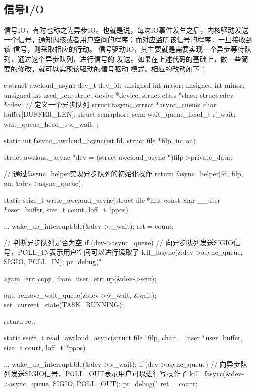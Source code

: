 \subsection{信号I/O}
信号IO，有时也称之为异步IO。也就是说，每次IO事件发生之后，内核驱动发送
一个信号，通知内核或者用户空间的程序；而对应监听该信号的程序，一旦接收到该
信号，则采取相应的行动。
信号驱动IO，其主要就是需要实现一个异步等待队列，通过这个异步队列，进行信号的
发送。如果在上述代码的基础上，做一些简要的修改，就可以实现该驱动的信号驱动
模式。相应的改动如下：
\begin{code-block}{c}
struct awcloud_async {
        dev_t                dev_id;                                                                                   unsigned int         major;
        unsigned int         minor;
        unsigned int         used_len;
        struct device        *device;
        struct class         *class;
        struct cdev          *cdev;
        // 定义一个异步队列
        struct fasync_struct *async_queue;
        char                 buffer[BUFFER_LEN];
        struct semaphore     sem;
        wait_queue_head_t    r_wait;
        wait_queue_head_t    w_wait;
};

static int fasync_awcloud_async(int fd, struct file *filp, int on)
{
        struct awcloud_async *dev = (struct awcloud_async *)filp->private_data;

        // 通过fasync_helper实现异步队列的初始化操作
        return fasync_helper(fd, filp, on, &dev->async_queue);
}

static ssize_t write_awcloud_async(struct file *filp,
        const char __user *user_buffer, size_t count, loff_t *ppos)
{
        ...
        wake_up_interruptible(&dev->r_wait);
        ret = count;

        // 判断异步队列是否为空
        if (dev->async_queue) {
                // 向异步队列发送SIGIO信号，POLL_IN表示用户空间可以进行读取了
                kill_fasync(&dev->async_queue, SIGIO, POLL_IN);
                pr_debug("%
        }

again_err:
copy_from_user_err:
        up(&dev->sem);

out:
        remove_wait_queue(&dev->w_wait, &wait);
        set_current_state(TASK_RUNNING);

        return ret;
}

static ssize_t read_awcloud_async(struct file *filp,
        char __user *user_buffer, size_t count, loff_t *ppos)
{
        ...
        wake_up_interruptible(&dev->w_wait);
        if (dev->async_queue) {
                // 向异步队列发送SIGIO信号，POLL_OUT表示用户可以进行写操作了
                kill_fasync(&dev->async_queue, SIGIO, POLL_OUT);
                pr_debug("%
        }
        ret = count;

}
\end{code-block}
